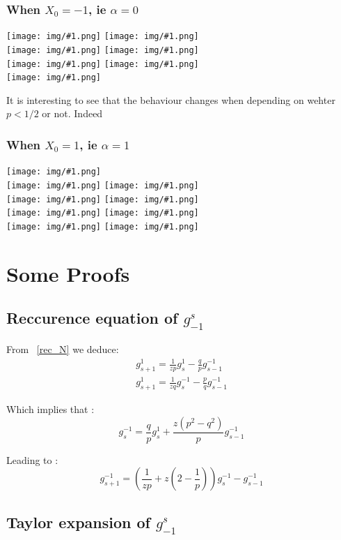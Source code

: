 \documentclass{article}
\newcommand{\g}[2]{g_{#1}^{#2}}
\newcommand{\IMG}[1] { \texttt{[image: img/\#1.png]} }
\begin{document}
\subsubsection*{When $X_0 = -1$, ie $\alpha=0$}
\IMG{0}
\IMG{3} \\
\IMG{4} 
\IMG{7} \\
\IMG{8}
\IMG{9} \\
\IMG{10}

It is interesting to see that the behaviour changes when depending on wehter $p < 1/2$ or not. Indeed
\newpage

\subsubsection*{When $X_0 = 1$, ie $\alpha=1$}

\IMG{11} \\
\IMG{12}
\IMG{13} \\
\IMG{14}
\IMG{15} \\
\IMG{16}
\IMG{17} \\
\IMG{18}
\IMG{19} \\
\appendix

\section{ Some Proofs }

\subsection{ Reccurence equation of $\g{-1}{s}$ }
From ~\ref{rec_N}  we deduce:
\begin{align*}
		\g{s+1}{1} = \frac{1}{z p} \g{s}{1} - \frac{q}{p} \g{s-1}{-1} \\
		\g{s+1}{1} = \frac{1}{ zq} \g{s}{-1} - \frac{p}{q} \g{s-1}{-1}
\end{align*}

Which implies that :
\begin{equation*}
		\g{s}{-1} =\frac{q}{p} \g{s}{1}+\frac{z (p^{2}-q^{2})}{p} \g{s-1}{-1}
\end{equation*}

Leading to :
\begin{equation*}
		\g{s+1}{-1} =  (\frac{1}{z p}   + z(2 - \frac{1}{p})) \g{s}{-1}  -  \g{s-1}{-1} 
\end{equation*}


\subsection{Taylor expansion of $\g{-1}{s}$}
\end{document}
